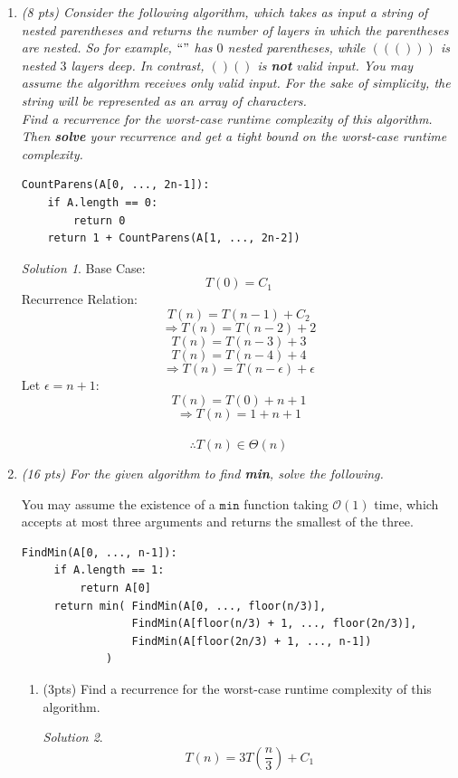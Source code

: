 \documentclass[12pt]{article}
\theoremstyle{remark}
\newtheorem*{solution}{Solution}
\newcommand{\makenonemptybox}[2]{%
\item[]
\fbox{%
\parbox[c][#1][t]{\dimexpr\linewidth-2\fboxsep-2\fboxrule}{
  \hrule width \hsize height 0pt
  #2
 }%
}%
\par\vspace{\ht\strutbox}
}
\begin{document}
\begin{enumerate}
\pagebreak
\item{\itshape (8 pts) Consider the following algorithm, which takes as input a string of nested parentheses and returns the number of layers in which the parentheses are nested. So for example, $``"$ has $0$ nested parentheses, while $((()))$ is nested $3$ layers deep. In contrast, $()()$ is \textbf{not} valid input. You may assume the algorithm receives only valid input. For the sake of simplicity, the string will be represented as an array of characters. \\

\noindent Find a recurrence for the worst-case runtime complexity of this algorithm. Then \textbf{solve} your recurrence and get a tight bound on the worst-case runtime complexity.}
\begin{verbatim}
CountParens(A[0, ..., 2n-1]):
    if A.length == 0:
        return 0
    return 1 + CountParens(A[1, ..., 2n-2])
\end{verbatim}
\begin{solution}
 Base Case: $$T(0) = C_1$$ Recurrence Relation: $$T(n) = T(n-1) + C_2$$ $$\Rightarrow T(n) = T(n-2) + 2$$ $$T(n) = T(n-3) + 3$$ $$T(n) = T(n-4) +4$$ $$\Rightarrow T(n) = T(n-\epsilon) + \epsilon$$ Let $\epsilon = n+1$: $$ T(n) = T(0) + n+1$$ $$ \Rightarrow T(n) = 1+n+1$$ \\ $$\therefore T(n) \in \Theta(n)$$
\end{solution}

\pagebreak
\item{\itshape (16 pts) For the given algorithm to find \textbf{min}, solve the following.

You may assume the existence of a $\texttt{min}$ function taking $\mathcal{O}(1)$ time, which accepts at most three arguments and returns the smallest of the three.}
\begin{verbatim}
FindMin(A[0, ..., n-1]):
     if A.length == 1:
         return A[0]
     return min( FindMin(A[0, ..., floor(n/3)], 
                 FindMin(A[floor(n/3) + 1, ..., floor(2n/3)],
                 FindMin(A[floor(2n/3) + 1, ..., n-1])
             )
\end{verbatim}
\begin{enumerate}[label=(\alph*)]
\item (3pts) Find a recurrence for the worst-case runtime complexity of this algorithm.
\begin{solution}
$$T(n) = 3T(\frac{n}{3}) + C_1$$
\end{solution}
\pagebreak


\end{enumerate}
\end{enumerate}
\end{document}
